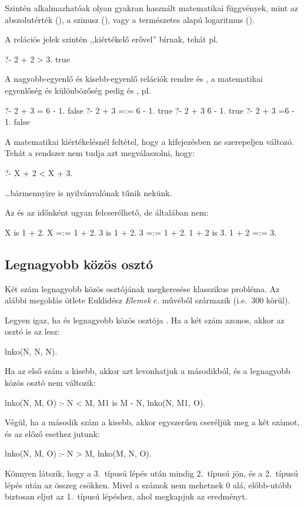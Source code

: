 Szintén alkalmazhatóak olyan gyakran használt
matematikai függvények, mint az abszolutérték
(), a szinusz (), vagy a természetes
alapú logaritmus ().

A relációs jelek szintén ,,kiértékelő erővel''
bírnak, tehát pl.
\begin{query}
?- 2 + 2 > 3.
true
\end{query}
A nagyobb-egyenlő és kisebb-egyenlő relációk rendre
\pr{>=} és \pr{=<}, a matematikai egyenlőség és
különbözőség pedig \pr{=:=} és \pr{=\textbackslash=}, pl.
\index{\pr{>}}\index{\pr{<}}
\index{\pr{>=}}\index{\pr{=<}}
\index{\pr{=:=}}\index{\pr{=\textbackslash=}}
\begin{query}
?- 2 + 3 = 6 - 1.
false
?- 2 + 3 =:= 6 - 1.
true
?- 2 + 3 \= 6 - 1.
true
?- 2 + 3 =\= 6 - 1.
false
\end{query}

A matematikai kiértékelésnél feltétel, hogy a
kifejezésben ne szerepeljen változó. Tehát a
rendszer nem tudja azt megválaszolni, hogy:
\begin{query}
?- X + 2 < X + 3.
\end{query}
\dots bármennyire is nyilvánvalónak tűnik nekünk.

Az  és az \pr{=:=} időnként ugyan
felcserélhető, de általában nem:
\begin{query}
X is 1 + 2.  %
X =:= 1 + 2. %
3 is 1 + 2.  %
3 =:= 1 + 2. %
1 + 2 is 3.  %
1 + 2 =:= 3. %
\end{query}

\subsection*{Legnagyobb közös osztó}

Két szám legnagyobb közös osztójának megkeresése
klasszikus probléma. Az alábbi megoldás ötlete
Euklidész \emph{Elemek} c. művéből származik
(i.e.~300 körül).

Legyen  igaz, ha  és 
legnagyobb közös osztója . Ha a két szám
azonos, akkor az osztó is az lesz:
\begin{program}
lnko(N, N, N).
\end{program}
Ha az első szám a kisebb, akkor azt levonhatjuk a
másodikból, és a legnagyobb közös osztó nem
változik:
\begin{program}
lnko(N, M, O) :-
    N < M,
    M1 is M - N,
    lnko(N, M1, O).
\end{program}
Végül, ha a második szám a kisebb, akkor egyszerűen
cseréljük meg a két számot, és az előző esethez
jutunk:
\begin{program}
lnko(N, M, O) :-
    N > M,
    lnko(M, N, O).
\end{program}
Könnyen látszik, hogy a 3.~típusú lépés után mindig
2.~típusú jön, és a 2.~típusú lépés után az  összeg csökken. Mivel a számok nem mehetnek 0
alá, előbb-utóbb biztosan eljut az 1.~típusú
lépéshez, ahol megkapjuk az eredményt.

